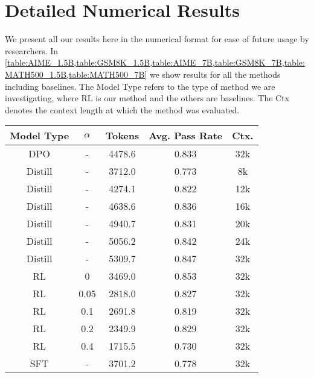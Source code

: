 \section{Detailed Numerical Results}
We present all our results here in the numerical format for ease of future usage by researchers. In \cref{table:AIME_1.5B,table:GSM8K_1.5B,table:AIME_7B,table:GSM8K_7B,table:MATH500_1.5B,table:MATH500_7B} we show results for all the methods including baselines. The Model Type refers to the type of method we are investigating, where RL is our method and the others are baselines. The Ctx denotes the context length at which the method was evaluated. 


\begin{center}
\begin{table}[h]
\begin{tabular}{ccccc}
\hline
\textbf{Model Type} & \textbf{$\alpha$} & \textbf{Tokens} & \textbf{Avg. Pass Rate} & \textbf{Ctx.} \\ \hline
DPO & - & 4478.6 & 0.833 & 32k \\
Distill & - & 3712.0 & 0.773 & 8k \\
Distill & - & 4274.1 & 0.822 & 12k \\
Distill & - & 4638.6 & 0.836 & 16k \\
Distill & - & 4940.7 & 0.831 & 20k \\
Distill & - & 5056.2 & 0.842 & 24k \\
Distill & - & 5309.7 & 0.847 & 32k \\
RL & 0 & 3469.0 & 0.853 & 32k \\
RL & 0.05 & 2818.0 & 0.827 & 32k \\
RL & 0.1 & 2691.8 & 0.819 & 32k \\
RL & 0.2 & 2349.9 & 0.829 & 32k \\
RL & 0.4 & 1715.5 & 0.730 & 32k \\
SFT & - & 3701.2 & 0.778 & 32k\\
\hline
\end{tabular}


\end{table}
\end{center}

